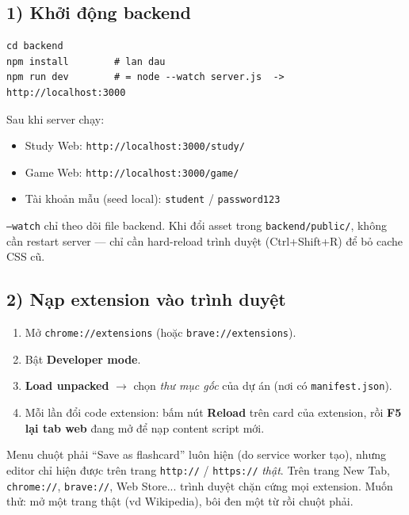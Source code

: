 \documentclass[11pt,a4paper]{article}
\newcommand{\code}[1]{\texttt{#1}}
\begin{document}
\subsection{1) Khởi động backend}
\begin{lstlisting}
cd backend
npm install        # lan dau
npm run dev        # = node --watch server.js  ->  http://localhost:3000
\end{lstlisting}

\noindent Sau khi server chạy:
\begin{itemize}
  \item Study Web: \code{http://localhost:3000/study/}
  \item Game Web: \code{http://localhost:3000/game/}
  \item Tài khoản mẫu (seed local): \code{student} / \code{password123}
\end{itemize}

\begin{tip}
\code{--watch} chỉ theo dõi file backend. Khi đổi asset trong \code{backend/public/}, không cần
restart server — chỉ cần hard-reload trình duyệt (Ctrl+Shift+R) để bỏ cache CSS cũ.
\end{tip}

\subsection{2) Nạp extension vào trình duyệt}
\begin{enumerate}
  \item Mở \code{chrome://extensions} (hoặc \code{brave://extensions}).
  \item Bật \textbf{Developer mode}.
  \item \textbf{Load unpacked} $\rightarrow$ chọn \emph{thư mục gốc} của dự án (nơi có \code{manifest.json}).
  \item Mỗi lần đổi code extension: bấm nút \textbf{Reload} trên card của extension,
        rồi \textbf{F5 lại tab web} đang mở để nạp content script mới.
\end{enumerate}

\begin{note}
Menu chuột phải ``Save as flashcard'' luôn hiện (do service worker tạo), nhưng editor chỉ hiện
được trên trang \code{http://} / \code{https://} \emph{thật}. Trên trang New Tab, \code{chrome://},
\code{brave://}, Web Store... trình duyệt chặn cứng mọi extension. Muốn thử: mở một trang thật
(vd Wikipedia), bôi đen một từ rồi chuột phải.
\end{note}
\end{document}

